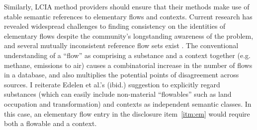 Similarly, LCIA method providers should ensure that their methods make use of stable semantic references to elementary flows and contexts.  Current research has revealed widespread challenges to finding consistency on the identities of elementary flows despite the community's longstanding awareness of the problem, and several mutually inconsistent reference flow sets exist \citep{Edelen_2017}.  The conventional understanding of a ``flow'' as comprising a substance and a context together (e.g. methane, emissions to air) causes a combinatorial increase in the number of flows in a database, and also multiplies the potential points of disagreement across sources.  I reiterate Edelen et al.'s (ibid.) suggestion to explicitly regard substances (which can easily include non-material ``flowables'' such as land occupation and transformation) and contexts as independent semantic classes.  In this case, an elementary flow entry in the disclosure item~\ref{itm:em} would require both a flowable and a context.

\endinput

It is necessary for the entries in disclosure items~\ref{itm:bg} and \ref{itm:em} to be unambiguous and easy to interpret.  Entries in \ref{itm:bg}, which represent rows in $A_d$, must clearly identify the originating database, version, and configuration, along with the precise dataset, that dataset's reference flow, and the dimension (reference quantity or unit) of that flow.  In addition, the sign of the numeric entry in $A_d$ must be consistent with the implementation of the background dataset.  Similar requirements also hold for entries in \ref{itm:em}, which represent rows in $B_f$.
